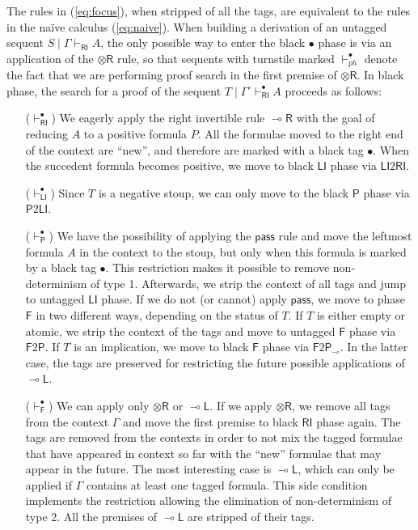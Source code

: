 \documentclass[submission,copyright,creativecommons]{eptcs}
\theoremstyle{definition}
\newcommand{\tl}{\otimes \mathsf{L}}
\newcommand{\tr}{\otimes \mathsf{R}}
\newcommand{\lright}{{\multimap}\mathsf{R}}
\newcommand{\lleft}{{\multimap}\mathsf{L}}
\newcommand{\pass}{\mathsf{pass}}
\newcommand{\unitl}{\mathsf{IL}}
\newcommand{\lolli}{\multimap}
\newcommand{\RI}{\mathsf{RI}}
\newcommand{\LI}{\mathsf{LI}}
\newcommand{\Pass}{\mathsf{P}}
\newcommand{\F}{\mathsf{F}}
\begin{document}
The rules in (\ref{eq:focus}), when stripped of all the tags, are equivalent to the rules in the na{\"i}ve calculus (\ref{eq:naive}). When building a derivation of an untagged sequent $S \mid \Gamma \vdash_\RI A$, the only possible way to enter the black $\bullet$ phase is via an application of the $\tr$ rule, so that sequents with turnstile marked $\vdash_{ph}^\bullet$ denote the fact that we are performing proof search in the first premise of $\tr$.
In black phase, the search for a proof of the sequent $T \mid \Gamma^\circ \vdash^\bullet_\RI A$ proceeds as follows:
\begin{itemize}
\item[($\vdash^\bullet_\RI$)] We eagerly apply the right invertible rule $\lright$ with the goal of reducing $A$ to a positive formula $P$. All the formulae moved to the right end of the context are ``new'', and therefore are marked with a black tag $\bullet$.
  When the succedent formula becomes positive, we move to black $\LI$ phase via $\LI2\RI$.
\item[($\vdash^\bullet_\LI$)] Since $T$ is a negative stoup, we can only move to the black $\Pass$ phase via $\Pass2\LI$.
\item[($\vdash^\bullet_\Pass$)] We have the possibility of applying the $\pass$ rule and move the leftmost formula $A$ in the context to the stoup, but only when this formula is marked by a black tag $\bullet$. This restriction makes it possible to remove non-determinism of type 1. Afterwards, we strip the context of all tags and jump to untagged $\LI$ phase. If we do not (or cannot) apply $\pass$, we move to phase $\F$  in two different ways, depending on the status of $T$. If $T$ is either empty or atomic, we strip the context of the tags and move to untagged $\F$ phase via $\F2\Pass$. If $T$ is an implication, we move to black $\F$ phase via $\F2\Pass_\lolli$. In the latter case, the tags are preserved for restricting the future possible applications of $\lleft$.
\item[($\vdash^\bullet_\F$)] We can apply only $\tr$ or $\lleft$. If we apply $\tr$, we remove all tags from the context $\Gamma$ and move the first premise to black $\RI$ phase again. The tags are removed from the contexts in order to not mix the tagged formulae that have appeared in context so far with the ``new'' formulae that may appear in the future. The most interesting case is $\lleft$, which can only be applied if $\Gamma$ contains at least one tagged formula. This side condition implements the restriction allowing the elimination of non-determinism of type 2. All the premises of $\lleft$ are stripped of their tags.
\end{itemize}
\end{document}
